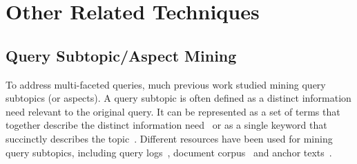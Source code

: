 \section{Other Related Techniques}
\label{sec:bg-others}
\subsection{Query Subtopic/Aspect Mining}
To address multi-faceted queries, much previous work studied mining query subtopics (or aspects). 
A query subtopic is often defined as a distinct information need relevant to the original query.
It can be represented as a set of terms that together describe the distinct information need~\cite{wang2009mining,wu2011identifying, dang2011inferring} or as a single keyword that succinctly describes the topic~\cite{song2011overview}. 
Different resources have been used for mining query subtopics, including query logs~\cite{wang2007learn,hu2012mining,xue2011topic,wang2009mining,wu2011identifying,yin2010building}, document corpus~\cite{allan2002using} and anchor texts~\cite{dang2011inferring}.

